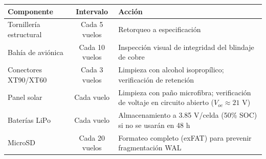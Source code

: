 \begin{table}[h]
\centering
\begin{tabular}{|l|c|p{7cm}|}
\hline
\textbf{Componente} & \textbf{Intervalo} & \textbf{Acción} \\ \hline
Tornillería estructural & Cada 5 vuelos & Retorqueo a especificación \\ \hline
Bahía de aviónica & Cada 10 vuelos & Inspección visual de integridad del blindaje de cobre \\ \hline
Conectores XT90/XT60 & Cada 3 vuelos & Limpieza con alcohol isopropílico; verificación de retención \\ \hline
Panel solar & Cada vuelo & Limpieza con paño microfibra; verificación de voltaje en circuito abierto ($V_{oc} \approx 21$ V) \\ \hline
Baterías LiPo & Cada vuelo & Almacenamiento a 3.85 V/celda (50\% SOC) si no se usarán en 48 h \\ \hline
MicroSD & Cada 20 vuelos & Formateo completo (exFAT) para prevenir fragmentación WAL \\ \hline
\end{tabular}
\end{table}

